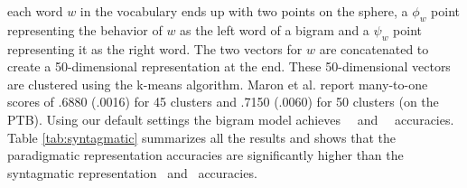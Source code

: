 each word $w$ in the vocabulary ends up with two points on the sphere,
a $\phi_w$ point representing the behavior of $w$ as the left word of
a bigram and a $\psi_w$ point representing it as the right word.  The
two vectors for $w$ are concatenated to create a 50-dimensional
representation at the end.  These 50-dimensional vectors are clustered
using the k-means algorithm.  Maron et al. 
report many-to-one scores of .6880 (.0016) for 45 clusters and .7150
(.0060) for 50 clusters (on the PTB).  Using our default settings the
bigram model achieves \bgmto\ \mto\ and \bgvm\ \vm\ accuracies.  Table
\ref{tab:syntagmatic} summarizes all the results and shows that the
paradigmatic representation accuracies are significantly higher than
the syntagmatic representation \mto\ and \vm\ accuracies.
